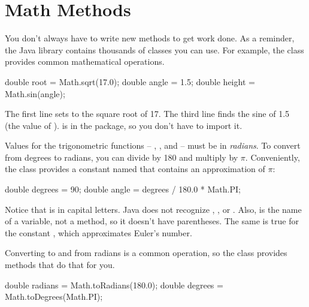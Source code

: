 

\section{Math Methods}


You don't always have to write new methods to get work done.
As a reminder, the Java library contains thousands of classes you can use.
For example, the  class provides common mathematical operations.

\begin{code}
double root = Math.sqrt(17.0);
double angle = 1.5;
double height = Math.sin(angle);
\end{code}

The first line sets  to the square root of 17.
The third line finds the sine of 1.5 (the value of ).
 is in the  package, so you don't have to import it.


Values for the trigonometric functions -- , , and  -- must be in {\em radians}.
To convert from degrees to radians, you can divide by 180 and multiply by $\pi$.
Conveniently, the  class provides a constant named  that contains an approximation of $\pi$:

\begin{code}
double degrees = 90;
double angle = degrees / 180.0 * Math.PI;
\end{code}

Notice that  is in capital letters.
Java does not recognize , , or .
Also,  is the name of a variable, not a method, so it doesn't have parentheses.
The same is true for the constant , which approximates Euler's number.

Converting to and from radians is a common operation, so the  class provides methods that do that for you.

\begin{code}
double radians = Math.toRadians(180.0);
double degrees = Math.toDegrees(Math.PI);
\end{code}


